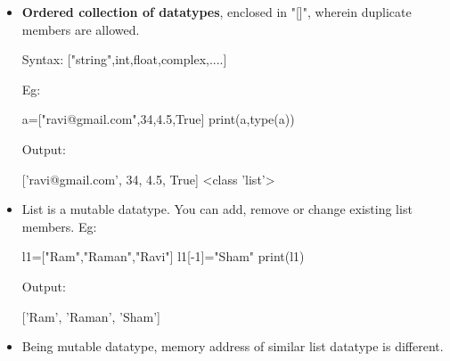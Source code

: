 
\begin{flushleft}
	\begin{itemize}
		\item \textbf{Ordered collection of datatypes}, enclosed in "[]", wherein duplicate members are allowed.
		\begin{tcolorbox}[breakable,notitle,boxrule=1pt,colback=pink,colframe=pink]
			\color{black}
			\font=8pt
			Syntax: ["string",int,float,complex,....]
			\font=4pt
		\end{tcolorbox}
		
		Eg:	
		\begin{tcolorbox}[breakable,notitle,boxrule=-0pt,colback=code,colframe=code]
			\color{white}
			\font=8pt
			a=["ravi@gmail.com",34,4.5,True]
			\newline
			print(a,type(a))
			\font=4pt
		\end{tcolorbox}
		
		Output:
		\begin{tcolorbox}[breakable,notitle,boxrule=-0pt,colback=output,colframe=output]
			\color{black}
			['ravi@gmail.com', 34, 4.5, True] <class 'list'>
			\font=4pt
		\end{tcolorbox}
		
	  \bigskip
	  
	  \item List is a mutable datatype. You can add, remove or change existing list members.
	  \newline
	  Eg:			
	  \begin{tcolorbox}[breakable,notitle,boxrule=-0pt,colback=code,colframe=code]
	  	\color{white}
	  	\font=8pt
	  	l1=["Ram","Raman","Ravi"] \newline
	  	l1[-1]="Sham" \newline
	  	print(l1)
	  	\font=4pt
	  \end{tcolorbox}

		Output:
		\begin{tcolorbox}[breakable,notitle,boxrule=-0pt,colback=output,colframe=output]
			\color{black}
			['Ram', 'Raman', 'Sham']
			\font=4pt
		\end{tcolorbox}

	  \bigskip
	  \item Being mutable datatype, memory address of similar list datatype is different.
	  
	\end{itemize}
	
\end{flushleft}



